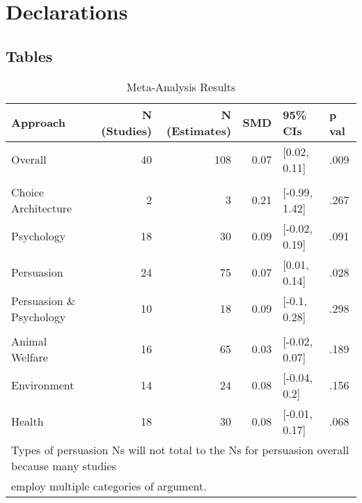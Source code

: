 \documentclass[sn-nature,referee,pdflatex]{sn-jnl}
\begin{document}
\section*{Declarations}\label{declarations}

\newpage

\subsection{Tables}\label{tables}

\begin{table}[!h]
\centering
\caption{\label{tab:table_one}Meta-Analysis Results}
\centering
\begin{tabular}[t]{lrrrll}
\toprule
Approach & N (Studies) & N (Estimates) & SMD & 95\% CIs & p val\\
\midrule
Overall & 40 & 108 & 0.07 & {}[0.02, 0.11] & .009\\
\addlinespace[0.5em]
\multicolumn{6}{l}{\textbf{Theory}}\\
\hspace{1em}Choice Architecture & 2 & 3 & 0.21 & {}[-0.99, 1.42] & .267\\
\hspace{1em}Psychology & 18 & 30 & 0.09 & {}[-0.02, 0.19] & .091\\
\hspace{1em}Persuasion & 24 & 75 & 0.07 & {}[0.01, 0.14] & .028\\
\hspace{1em}Persuasion \& Psychology & 10 & 18 & 0.09 & {}[-0.1, 0.28] & .298\\
\addlinespace[0.5em]
\multicolumn{6}{l}{\textbf{Type of Persuasion}}\\
\hspace{1em}Animal Welfare & 16 & 65 & 0.03 & {}[-0.02, 0.07] & .189\\
\hspace{1em}Environment & 14 & 24 & 0.08 & {}[-0.04, 0.2] & .156\\
\hspace{1em}Health & 18 & 30 & 0.08 & {}[-0.01, 0.17] & .068\\
\bottomrule
\multicolumn{6}{l}{\textsuperscript{} Types of persuasion Ns will not total to the Ns for persuasion overall because many studies}\\
\multicolumn{6}{l}{employ multiple categories of argument.}\\
\end{tabular}
\end{table}
\end{document}
